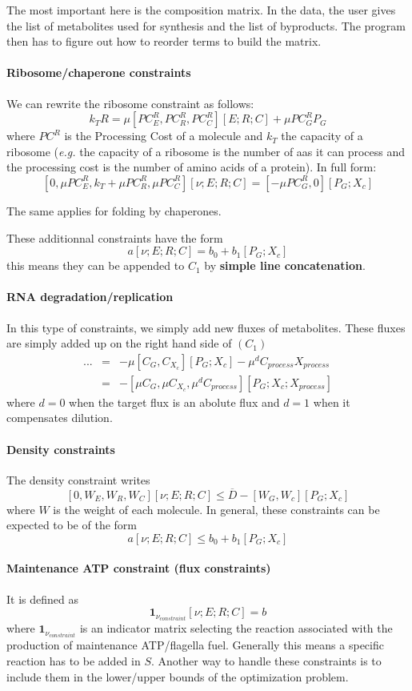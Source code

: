 The most important here is the composition matrix. In the data, the user gives the list of metabolites used for synthesis and the list of byproducts. The program then has to figure out how to reorder terms to build the matrix.

\paragraph{Ribosome/chaperone constraints} We can rewrite the ribosome constraint as follows:
\[
k_TR = \mu [PC^R_E,PC^R_R,PC^R_C] [E;R;C] + \mu PC^R_GP_G
\]
where $PC^R$ is the Processing Cost of a molecule and $k_T$ the capacity of a ribosome (\textit{e.g.} the capacity of a ribosome is the number of aas it can process and the processing cost is the number of amino acids of a protein).
In full form:
\[
[0,\mu PC^R_E,k_T+\mu PC^R_R,\mu PC^R_C] [\nu;E;R;C] = [-\mu PC^R_G,0][P_G;X_c]
\]

The same applies for folding by chaperones. 

These additionnal constraints have the form
\[
a [\nu; E; R; C] = b_0 + b_1 [P_G;X_c]
\]
this means they can be appended to $C_1$ by \textbf{simple line concatenation}.

\paragraph{RNA degradation/replication} In this type of constraints, we simply add new fluxes of metabolites. These fluxes are simply added up on the right hand side of $(C_1)$
\[
\begin{array}{rcl}
...  & = & -\mu[C_G,C_{X_c}][P_G;X_c] - \mu^{d}C_{process}X_{process} \\
 & =  & -[\mu C_G, \mu C_{X_c},\mu^d C_{process}][P_G;X_c;X_{process}]
\end{array}
\]
where $d = 0$ when the target flux is an abolute flux and $d=1$ when it compensates dilution.

\paragraph{Density constraints} The density constraint writes
\[
[0,W_E,W_R,W_C] [\nu;E;R;C] \leq \overline{D} - [W_G,W_c][P_G;X_c]
\]
where $W$ is the weight of each molecule.
In general, these constraints can be expected to be of the form
\[
a [\nu; E; R; C] \leq b_0 + b_1 [P_G;X_c]
\]

\paragraph{Maintenance ATP constraint (flux constraints)} It is defined as
\[
\mathbf{1}_{\nu_{constraint}} [\nu; E; R; C] = b
\]
where $\mathbf{1}_{\nu_{constraint}}$ is an indicator matrix selecting the reaction associated with the production of maintenance ATP/flagella fuel. Generally this means a specific reaction has to be added in $S$. Another way to handle these constraints is to include them in the lower/upper bounds of the optimization problem.

